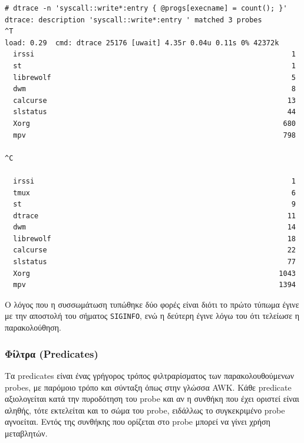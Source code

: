 \documentclass[12pt]{article}
\begin{document}
\begin{lstlisting}
# dtrace -n 'syscall::write*:entry { @progs[execname] = count(); }'
dtrace: description 'syscall::write*:entry ' matched 3 probes
^T
load: 0.29  cmd: dtrace 25176 [uwait] 4.35r 0.04u 0.11s 0% 42372k
  irssi                                                             1
  st                                                                1
  librewolf                                                         5
  dwm                                                               8
  calcurse                                                         13
  slstatus                                                         44
  Xorg                                                            680
  mpv                                                             798

^C

  irssi                                                             1
  tmux                                                              6
  st                                                                9
  dtrace                                                           11
  dwm                                                              14
  librewolf                                                        18
  calcurse                                                         22
  slstatus                                                         77
  Xorg                                                           1043
  mpv                                                            1394
\end{lstlisting}

Ο λόγος που η συσσωμάτωση τυπώθηκε δύο φορές είναι διότι το πρώτο τύπωμα έγινε
με την αποστολή του σήματος \lstinline{SIGINFO}, ενώ η δεύτερη έγινε λόγω του
ότι τελείωσε η παρακολούθηση.

\subsubsection{Φίλτρα (Predicates)}

Τα predicates είναι ένας γρήγορος τρόπος φιλτραρίσματος των παρακολουθούμενων
probes, με παρόμοιο τρόπο και σύνταξη όπως στην γλώσσα AWK. Κάθε predicate
αξιολογείται κατά την πυροδότηση του probe και αν η συνθήκη που έχει οριστεί
είναι αληθής, τότε εκτελείται και το σώμα του probe, ειδάλλως το συγκεκριμένο
probe αγνοείται. Εντός της συνθήκης που ορίζεται στο probe μπορεί να γίνει
χρήση μεταβλητών.
\end{document}
